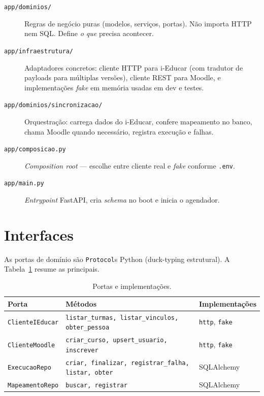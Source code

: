 \documentclass[
	12pt,
	oneside,
	a4paper,
	chapter=TITLE,
	section=TITLE,
	sumario=tradicional,
	english,
	brazil
]{abntex2}
\begin{document}
\begin{description}
    \item[\texttt{app/dominios/}] Regras de negócio puras (modelos, serviços, portas).
    Não importa HTTP nem SQL. Define \emph{o que} precisa acontecer.
    \item[\texttt{app/infraestrutura/}] Adaptadores concretos: cliente HTTP para i-Educar
    (com tradutor de payloads para múltiplas versões), cliente REST para Moodle, e
    implementações \emph{fake} em memória usadas em dev e testes.
    \item[\texttt{app/dominios/sincronizacao/}] Orquestração: carrega dados do i-Educar,
    confere mapeamento no banco, chama Moodle quando necessário, registra execução e
    falhas.
    \item[\texttt{app/composicao.py}] \emph{Composition root} --- escolhe entre cliente
    real e \emph{fake} conforme \texttt{.env}.
    \item[\texttt{app/main.py}] \emph{Entrypoint} FastAPI, cria \emph{schema} no boot e
    inicia o agendador.
\end{description}

\section{Interfaces}

As portas de domínio são \texttt{Protocol}s Python (duck-typing estrutural). A
Tabela~\ref{tab:portas} resume as principais.

\begin{table}[H]
\centering
\footnotesize
\begin{tabular}{lll}
\toprule
Porta & Métodos & Implementações \\
\midrule
\texttt{ClienteIEducar} & \texttt{listar\_turmas, listar\_vinculos, obter\_pessoa} & \texttt{http}, \texttt{fake} \\
\texttt{ClienteMoodle}  & \texttt{criar\_curso, upsert\_usuario, inscrever}         & \texttt{http}, \texttt{fake} \\
\texttt{ExecucaoRepo}   & \texttt{criar, finalizar, registrar\_falha, listar, obter} & SQLAlchemy \\
\texttt{MapeamentoRepo} & \texttt{buscar, registrar}                                & SQLAlchemy \\
\bottomrule
\end{tabular}
\caption{Portas e implementações.}
\label{tab:portas}
\end{table}
\end{document}
